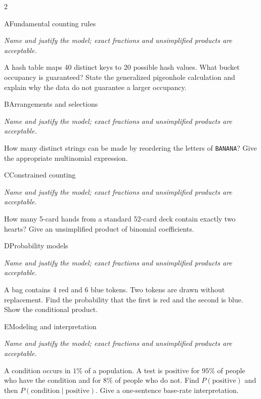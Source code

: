 \documentclass[9pt]{extarticle}
\begin{document}
\begin{multicols}{2}
\begin{CoreProblem}{A}{Fundamental counting rules}
{\scriptsize\textit{Name and justify the model; exact fractions and unsimplified products are acceptable.}\par}
A hash table maps 40 distinct keys to 20 possible hash values. What
    bucket occupancy is guaranteed? State the generalized pigeonhole calculation
    and explain why the data do not guarantee a larger occupancy.
\end{CoreProblem}
\begin{CoreProblem}{B}{Arrangements and selections}
{\scriptsize\textit{Name and justify the model; exact fractions and unsimplified products are acceptable.}\par}
How many distinct strings can be made by reordering the letters of
    \texttt{BANANA}? Give the appropriate multinomial expression.
\end{CoreProblem}
\begin{CoreProblem}{C}{Constrained counting}
{\scriptsize\textit{Name and justify the model; exact fractions and unsimplified products are acceptable.}\par}
How many 5-card hands from a standard 52-card deck contain exactly
    two hearts? Give an unsimplified product of binomial coefficients.
\end{CoreProblem}
\columnbreak
\begin{CoreProblem}{D}{Probability models}
{\scriptsize\textit{Name and justify the model; exact fractions and unsimplified products are acceptable.}\par}
A bag contains 4 red and 6 blue tokens. Two tokens are drawn without
    replacement. Find the probability that the first is red and the second is
    blue. Show the conditional product.
\end{CoreProblem}
\begin{CoreProblem}{E}{Modeling and interpretation}
{\scriptsize\textit{Name and justify the model; exact fractions and unsimplified products are acceptable.}\par}
A condition occurs in $1\%$ of a population. A test is positive for
    $95\%$ of people who have the condition and for $8\%$ of people who do not.
    Find $P(\text{positive})$ and then
    $P(\text{condition}\mid\text{positive})$. Give a one-sentence base-rate
    interpretation.
\end{CoreProblem}
\end{multicols}
\CoreWorkArea
\end{document}
